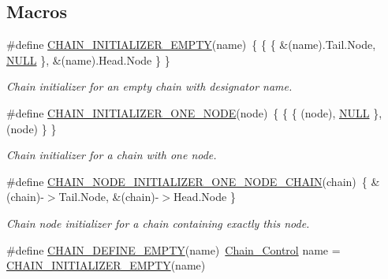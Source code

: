 \subsection*{Macros}
\begin{DoxyCompactItemize}
\item 
\mbox{\label{group__RTEMSScoreChain_ga837c307db69277bfb97d3ed4c22bc420}} 
\#define \mbox{\hyperlink{group__RTEMSScoreChain_ga837c307db69277bfb97d3ed4c22bc420}{C\+H\+A\+I\+N\+\_\+\+I\+N\+I\+T\+I\+A\+L\+I\+Z\+E\+R\+\_\+\+E\+M\+P\+TY}}(name)~\{ \{ \{ \&(name).Tail.\+Node, \mbox{\hyperlink{bestcomm__api_8h_a872bb74de61c3689ccd5b41873fce42c}{N\+U\+LL}} \}, \&(name).Head.\+Node \} \}
\begin{DoxyCompactList}\small\item\em Chain initializer for an empty chain with designator {\itshape name}. \end{DoxyCompactList}\item 
\#define \mbox{\hyperlink{group__RTEMSScoreChain_ga7a5473b2ce45742e83c906284e21bd90}{C\+H\+A\+I\+N\+\_\+\+I\+N\+I\+T\+I\+A\+L\+I\+Z\+E\+R\+\_\+\+O\+N\+E\+\_\+\+N\+O\+DE}}(node)~\{ \{ \{ (node), \mbox{\hyperlink{bestcomm__api_8h_a872bb74de61c3689ccd5b41873fce42c}{N\+U\+LL}} \}, (node) \} \}
\begin{DoxyCompactList}\small\item\em Chain initializer for a chain with one {\itshape node}. \end{DoxyCompactList}\item 
\#define \mbox{\hyperlink{group__RTEMSScoreChain_ga1d87ba1964e8793cb2f399c7a36b0e06}{C\+H\+A\+I\+N\+\_\+\+N\+O\+D\+E\+\_\+\+I\+N\+I\+T\+I\+A\+L\+I\+Z\+E\+R\+\_\+\+O\+N\+E\+\_\+\+N\+O\+D\+E\+\_\+\+C\+H\+A\+IN}}(chain)~\{ \&(chain)-\/$>$Tail.\+Node, \&(chain)-\/$>$Head.\+Node \}
\begin{DoxyCompactList}\small\item\em Chain node initializer for a {\itshape chain} containing exactly this node. \end{DoxyCompactList}\item 
\mbox{\label{group__RTEMSScoreChain_ga415040d014add2529ccc02756a580259}} 
\#define \mbox{\hyperlink{group__RTEMSScoreChain_ga415040d014add2529ccc02756a580259}{C\+H\+A\+I\+N\+\_\+\+D\+E\+F\+I\+N\+E\+\_\+\+E\+M\+P\+TY}}(name)~\mbox{\hyperlink{unionChain__Control}{Chain\+\_\+\+Control}} name = \mbox{\hyperlink{group__RTEMSScoreChain_ga837c307db69277bfb97d3ed4c22bc420}{C\+H\+A\+I\+N\+\_\+\+I\+N\+I\+T\+I\+A\+L\+I\+Z\+E\+R\+\_\+\+E\+M\+P\+TY}}(name)

\end{DoxyCompactItemize}
